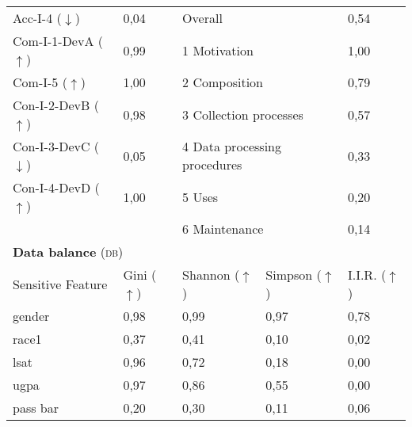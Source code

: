 \begin{table}[h]
\begin{tabular}{|p{3cm}|p{1.9cm}p{3cm}p{2.6cm}p{1.6cm}|}
        Acc-I-4 ($\downarrow$) & 0,04\cellcolor[HTML]{FEFAF9} & \multicolumn{2}{|l|}{Overall} & 0,54\cellcolor[HTML]{FDCCBD} \\
        Com-I-1-DevA ($\uparrow$) & 0,99\cellcolor[HTML]{FEFEFD} & \multicolumn{2}{|l|}{1 Motivation} & 1,00\cellcolor[HTML]{FFFFFF} \\
        Com-I-5 ($\uparrow$) & 1,00\cellcolor[HTML]{FFFFFF} & \multicolumn{2}{|l|}{2 Composition} & 0,79\cellcolor[HTML]{FEE7E0} \\
        Con-I-2-DevB ($\uparrow$) & 0,98\cellcolor[HTML]{FEFCFB} & \multicolumn{2}{|l|}{3 Collection processes} & 0,57\cellcolor[HTML]{FDD0C2} \\
        Con-I-3-DevC ($\downarrow$) & 0,05\cellcolor[HTML]{FEF9F8} & \multicolumn{2}{|l|}{4 Data processing procedures} & 0,33\cellcolor[HTML]{FDB6A0} \\
        Con-I-4-DevD ($\uparrow$) & 1,00\cellcolor[HTML]{FFFFFF} & \multicolumn{2}{|l|}{5 Uses} & 0,20\cellcolor[HTML]{FCA78E} \\ 
         & & \multicolumn{2}{|l|}{6 Maintenance} & 0,14\cellcolor[HTML]{FCA186} \\ \hline
        \multicolumn{5}{|l|}{\textbf{Data balance} (\textsc{db})} \\ \hline 
 		Sensitive Feature & Gini ($\uparrow$) & Shannon ($\uparrow$) & Simpson ($\uparrow$) & I.I.R. ($\uparrow$) \\ \hline
        gender & 0,98 & 0,99 & 0,97 & 0,78 \\
		race1 & 0,37\cellcolor[HTML]{fc8d59} & 0,41\cellcolor[HTML]{fc8d59} & 0,10\cellcolor[HTML]{fc8d59} & 0,02\cellcolor[HTML]{fc8d59} \\
		lsat & 0,96 & 0,72 & 0,18\cellcolor[HTML]{fc8d59} & 0,00\cellcolor[HTML]{fc8d59} \\
		ugpa & 0,97 & 0,86 & 0,55 & 0,00\cellcolor[HTML]{fc8d59} \\
		pass bar & 0,20\cellcolor[HTML]{fc8d59} & 0,30\cellcolor[HTML]{fc8d59} & 0,11\cellcolor[HTML]{fc8d59} & 0,06\cellcolor[HTML]{fc8d59} \\
		 \hline
    \end{tabular}
\end{table}
